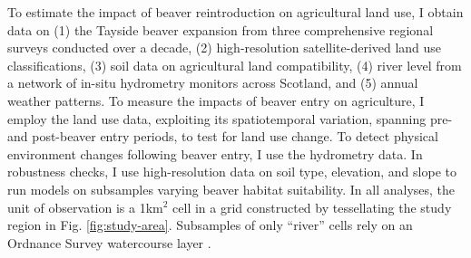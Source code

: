 To estimate the impact of beaver reintroduction on agricultural land use, I obtain data on (1) the Tayside beaver expansion from three comprehensive regional surveys conducted over a decade, (2) high-resolution satellite-derived land use classifications, (3) soil data on agricultural land compatibility, (4) river level from a network of in-situ hydrometry monitors across Scotland, and (5) annual weather patterns. To measure the impacts of beaver entry on agriculture, I employ the land use data, exploiting its spatiotemporal variation, spanning pre- and post-beaver entry periods, to test for land use change. To detect physical environment changes following beaver entry, I use the hydrometry data. In robustness checks, I use high-resolution data on soil type, elevation, and slope to run models on subsamples varying beaver habitat suitability. In all analyses, the unit of observation is a 1km$^2$ cell in a grid constructed by tessellating the study region in Fig. \ref{fig:study-area}. Subsamples of only ``river'' cells rely on an Ordnance Survey watercourse layer \citep{noauthor_os_2023}.

